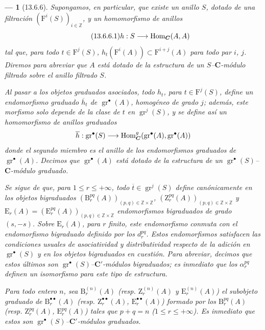 \documentclass[10pt,oneside,openany]{book}
\theoremstyle{egaenv}\newtheorem*{env}{---}
\theoremstyle{egastatement}
\theoremstyle{egadescription}
\newcommand{\oldpage}[2][]{\marginnote{\normalfont\scriptsize\textbf{#1}\,|\,#2}\ignorespaces}
\renewcommand{\leq}{\leqslant}
\renewcommand{\to}{\mathchoice{\longrightarrow}{\rightarrow}{\rightarrow}{\rightarrow}}
\begin{document}
\begin{env}[13.6.6]
\label{0.13.6.6}
\label{0.13.6.6-fr}
Supongamos, en particular, que existe un anillo $S$, dotado de una
\emph{filtración} $(\mathrm F^i(S))_{i\in\mathbb Z}$, y un homomorfismo
de anillos
\begin{equation}
\label{0.13.6.6.1-fr}
\tag{13.6.6.1}
h:S\to\operatorname{Hom}_{\boldsymbol{C}}(A,A)
\end{equation}
\oldpage[0\textsubscript{III}]{75}
tal que, para todo $t\in\mathrm F^j(S)$,
$h_t(\mathrm F^i(A))\subset\mathrm F^{i+j}(A)$ para todo par $i$, $j$. Diremos para abreviar que $A$ está dotado de la estructura de un
\emph{$S$--$\boldsymbol{C}$-módulo filtrado} sobre el anillo filtrado $S$.

Al pasar a los objetos graduados asociados, todo $h_t$, para
$t\in\mathrm F^j(S)$, define un endomorfismo \emph{graduado}
$\overline h_t$ de $\operatorname{gr}^\bullet(A)$, homogéneo de grado $j$; además, este morfismo solo depende de la clase de $t$ en $\operatorname{gr}^j(S)$, y se define así un homomorfismo de \emph{anillos graduados} \[
\overline h:\operatorname{gr}^\bullet(S)\to
\operatorname{Hom}_{\boldsymbol{C}}^g(\operatorname{gr}^\bullet(A),
\operatorname{gr}^\bullet(A))
\] donde el segundo miembro es el anillo de los endomorfismos \emph{graduados} de $\operatorname{gr}^\bullet(A)$.
Decimos que $\operatorname{gr}^\bullet(A)$ está dotado de la estructura
de un \emph{$\operatorname{gr}^\bullet(S)$--$\boldsymbol{C}$-módulo graduado}.

Se sigue de  que, para
$1\leq r\leq+\infty$, todo $\overline t\in\operatorname{gr}^j(S)$ define canónicamente en los objetos bigraduados $(\mathrm B_r^{pq}(A))_{(p,q)\in\mathbb Z\times\mathbb Z}$, $(\mathrm Z_r^{pq}(A))_{(p,q)\in\mathbb Z\times\mathbb Z}$ y $\mathrm E_r(A)=(\mathrm E_r^{pq}(A))_{(p,q)\in\mathbb Z\times\mathbb Z}$
endomorfismos bigraduados de grado $(s,-s)$.
Sobre $\mathrm E_r(A)$, para $r$ finito, este endomorfismo conmuta con
el endomorfismo bigraduado definido por los $d_r^{pq}$.
Estos endomorfismos satisfacen las condiciones usuales de asociatividad y
distributividad respecto de la adición en
$\operatorname{gr}^\bullet(S)$ y en los objetos bigraduados en cuestión.
Para abreviar, decimos que estos últimos son
\emph{$\operatorname{gr}^\bullet(S)$--$\boldsymbol{C}'$-módulos bigraduados};
es inmediato que los $\alpha_r^{pq}$ definen un \emph{isomorfismo} para
este tipo de estructura.

Para todo entero $n$, sea $\mathrm B_r^{(n)}(A)$
(resp. $\mathrm Z_r^{(n)}(A)$ y
$\mathrm E_r^{(n)}(A)$) el subobjeto graduado de $\mathrm B_r^{\bullet\bullet}(A)$ (resp. $\mathrm Z_r^{\bullet\bullet}(A)$, $\mathrm E_r^{\bullet\bullet}(A)$) formado por los $\mathrm B_r^{pq}(A)$ (resp. $\mathrm Z_r^{pq}(A)$, $\mathrm E_r^{pq}(A)$) tales que $p+q=n$ ($1\leq r\leq+\infty$).
Es inmediato que estos son
\emph{$\operatorname{gr}^\bullet(S)$--$\boldsymbol{C}'$-módulos graduados}.


\end{env}
\end{document}
